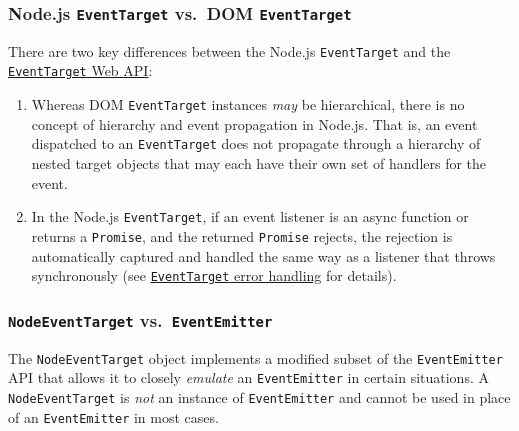 \subsubsection{\texorpdfstring{Node.js \texttt{EventTarget} vs.~DOM
\texttt{EventTarget}}{Node.js EventTarget vs.~DOM EventTarget}}\label{node.js-eventtarget-vs.-dom-eventtarget}

There are two key differences between the Node.js \texttt{EventTarget}
and the
\href{https://dom.spec.whatwg.org/\#eventtarget}{\texttt{EventTarget}
Web API}:

\begin{enumerate}
\def\labelenumi{\arabic{enumi}.}
\tightlist
\item
  Whereas DOM \texttt{EventTarget} instances \emph{may} be hierarchical,
  there is no concept of hierarchy and event propagation in Node.js.
  That is, an event dispatched to an \texttt{EventTarget} does not
  propagate through a hierarchy of nested target objects that may each
  have their own set of handlers for the event.
\item
  In the Node.js \texttt{EventTarget}, if an event listener is an async
  function or returns a \texttt{Promise}, and the returned
  \texttt{Promise} rejects, the rejection is automatically captured and
  handled the same way as a listener that throws synchronously (see
  \hyperref[eventtarget-error-handling]{\texttt{EventTarget} error
  handling} for details).
\end{enumerate}

\subsubsection{\texorpdfstring{\texttt{NodeEventTarget}
vs.~\texttt{EventEmitter}}{NodeEventTarget vs.~EventEmitter}}\label{nodeeventtarget-vs.-eventemitter}

The \texttt{NodeEventTarget} object implements a modified subset of the
\texttt{EventEmitter} API that allows it to closely \emph{emulate} an
\texttt{EventEmitter} in certain situations. A \texttt{NodeEventTarget}
is \emph{not} an instance of \texttt{EventEmitter} and cannot be used in
place of an \texttt{EventEmitter} in most cases.

